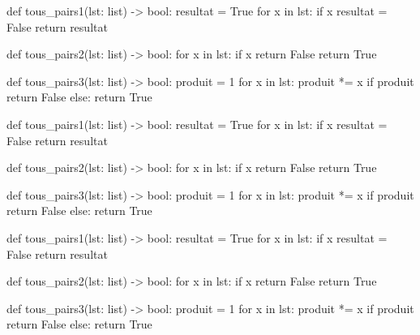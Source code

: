 \documentclass[a4paper,10pt,french]{article}
\begin{document}
\setlength\columnsep{2cm}
\begin{multicols}{3}
\begin{pythoncode}
def tous_pairs1(lst: list) -> bool:
    resultat = True
    for x in lst:
        if x %
            resultat = False
    return resultat
\end{pythoncode}

\begin{pythoncode}
def tous_pairs2(lst: list) -> bool:
    for x in lst:
        if x %
            return False
    return True
\end{pythoncode}

\begin{pythoncode}
def tous_pairs3(lst: list) -> bool:
    produit = 1
    for x in lst:
        produit *= x
    if produit %
        return False
    else:
        return True
\end{pythoncode}
\columnbreak
\begin{pythoncode}
def tous_pairs1(lst: list) -> bool:
    resultat = True
    for x in lst:
        if x %
            resultat = False
    return resultat
\end{pythoncode}

\begin{pythoncode}
def tous_pairs2(lst: list) -> bool:
    for x in lst:
        if x %
            return False
    return True
\end{pythoncode}

\begin{pythoncode}
def tous_pairs3(lst: list) -> bool:
    produit = 1
    for x in lst:
        produit *= x
    if produit %
        return False
    else:
        return True
\end{pythoncode}
\columnbreak
\begin{pythoncode}
def tous_pairs1(lst: list) -> bool:
    resultat = True
    for x in lst:
        if x %
            resultat = False
    return resultat
\end{pythoncode}

\begin{pythoncode}
def tous_pairs2(lst: list) -> bool:
    for x in lst:
        if x %
            return False
    return True
\end{pythoncode}

\begin{pythoncode}
def tous_pairs3(lst: list) -> bool:
    produit = 1
    for x in lst:
        produit *= x
    if produit %
        return False
    else:
        return True
\end{pythoncode}
\end{multicols}
\end{document}
